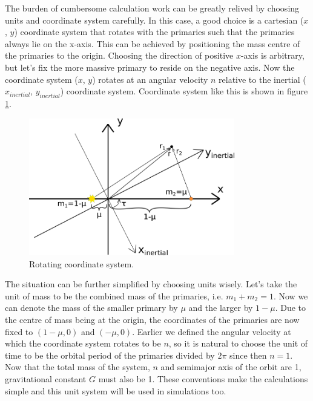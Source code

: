 \documentclass[12pt,a4paper,titlepage]{article}
\begin{document}
The burden of cumbersome calculation work can be greatly relived by choosing units and coordinate system carefully. In this case, a good choice is a cartesian ($x$, $y$) coordinate system that rotates with the primaries such that the primaries always lie on the x-axis. This can be achieved by positioning the mass centre of the primaries to the origin. Choosing the direction of positive $x$-axis is arbitrary, but let's fix the more massive primary to reside on the negative axis. Now the coordinate system ($x$, $y$) rotates at an angular velocity $n$ relative to the inertial ($x_{inertial}$, $y_{inertial}$) coordinate system. Coordinate system like this is shown in figure \ref{coordinates}.

\begin{figure}
\centering
\includegraphics[width=0.8\textwidth]{../plots/coordinates.png}
\caption{Rotating coordinate system.}
\label{coordinates}
\end{figure}

The situation can be further simplified by choosing units wisely. Let's take the unit of mass to be the combined mass of the primaries, i.e. $m_1+m_2 = 1$. Now we can denote the mass of the smaller primary by $\mu$ and the larger by $1-\mu$. Due to the centre of mass being at the origin, the coordinates of the primaries are now fixed to $(1-\mu, 0)$ and $(-\mu, 0)$. Earlier we defined the angular velocity at which the coordinate system rotates to be $n$, so it is natural to choose the unit of time to be the orbital period of the primaries divided by $2\pi$ since then $n=1$. Now that the total mass of the system, $n$ and semimajor axis of the orbit are 1, gravitational constant $G$ must also be 1. These conventions make the calculations simple and this unit system will be used in simulations too.
\end{document}
